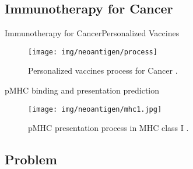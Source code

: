 \documentclass[10pt]{beamer}
\newcommand{\1}{
	\setbeamertemplate{background}{
		\texttt{[image: img/1]}
		\tikz[overlay] \fill[fill opacity=0.75,fill=white] (0,0) rectangle (-\paperwidth,\paperheight);
	}
}
\begin{document}
\subsection{Immunotherapy for Cancer  }

\begin{frame}{Immunotherapy for Cancer}{Personalized Vaccines}	
	\begin{figure}
		\texttt{[image: img/neoantigen/process]}
		\caption{Personalized vaccines process for Cancer \cite{peng2019neoantigen}.}
	\end{figure}		
\end{frame}



\begin{frame}{pMHC binding and presentation prediction}{}		
	\begin{figure}[H]
		\centering
		\texttt{[image: img/neoantigen/mhc1.jpg]}
		\caption{pMHC presentation process in MHC class I \cite{zhang2019application}.}
		\label{fig:mhc1}
	\end{figure}	
\end{frame}

\subsection{Problem}
\end{document}
